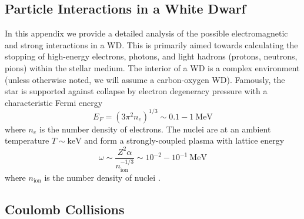 \documentclass[twocolumn,showpacs,preprintnumbers,amsmath,amssymb,prd]{revtex4}
\begin{document}
\begin{appendices}

\section{Particle Interactions in a White Dwarf}
\label{sec:appendix}
In this appendix we provide a detailed analysis of the possible electromagnetic and strong interactions in a WD.
This is primarily aimed towards calculating the stopping of high-energy electrons, photons, and light hadrons (protons, neutrons, pions) within the stellar medium.
The interior of a WD is a complex environment (unless otherwise noted, we will assume a carbon-oxygen WD).
Famously, the star is supported against collapse by electron degeneracy pressure with a characteristic Fermi energy
\begin{equation}
E_F = (3 \pi^2 n_e)^{1/3} \sim 0.1 - 1 ~\text{MeV}
\end{equation}
where $n_e$ is the number density of electrons.
The nuclei are at an ambient temperature $T \sim \text{keV}$ and form a strongly-coupled plasma with lattice energy
\begin{equation}
\label{eq:lattice}
\omega \sim \frac{Z^2 \alpha}{n_\text{ion}^{-1/3}} \sim 10^{-2} - 10^{-1} ~\text{MeV}
\end{equation}
where $n_\text{ion}$ is the number density of nuclei \cite{Teukolsky}.


\subsection*{Coulomb Collisions}


\end{appendices}
\end{document}
